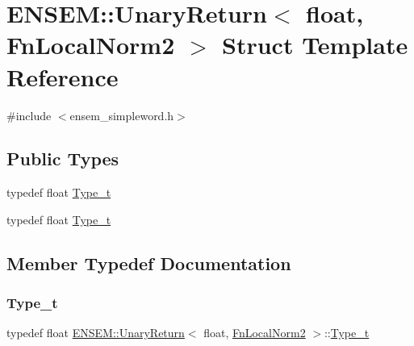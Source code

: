 \hypertarget{structENSEM_1_1UnaryReturn_3_01float_00_01FnLocalNorm2_01_4}{}\section{E\+N\+S\+EM\+:\+:Unary\+Return$<$ float, Fn\+Local\+Norm2 $>$ Struct Template Reference}
\label{structENSEM_1_1UnaryReturn_3_01float_00_01FnLocalNorm2_01_4}


{\ttfamily \#include $<$ensem\+\_\+simpleword.\+h$>$}

\subsection*{Public Types}
\begin{DoxyCompactItemize}
\item 
typedef float \mbox{\hyperlink{structENSEM_1_1UnaryReturn_3_01float_00_01FnLocalNorm2_01_4_ae3f20d3aa61a3012baf0d735dd9441d8}{Type\+\_\+t}}
\item 
typedef float \mbox{\hyperlink{structENSEM_1_1UnaryReturn_3_01float_00_01FnLocalNorm2_01_4_ae3f20d3aa61a3012baf0d735dd9441d8}{Type\+\_\+t}}
\end{DoxyCompactItemize}


\subsection{Member Typedef Documentation}
\mbox{\label{structENSEM_1_1UnaryReturn_3_01float_00_01FnLocalNorm2_01_4_ae3f20d3aa61a3012baf0d735dd9441d8}} 
\subsubsection{\texorpdfstring{Type\_t}{Type\_t}\hspace{0.1cm}{\footnotesize\ttfamily [1/2]}}
{\footnotesize\ttfamily typedef float \mbox{\hyperlink{structENSEM_1_1UnaryReturn}{E\+N\+S\+E\+M\+::\+Unary\+Return}}$<$ float, \mbox{\hyperlink{structENSEM_1_1FnLocalNorm2}{Fn\+Local\+Norm2}} $>$\+::\mbox{\hyperlink{structENSEM_1_1UnaryReturn_3_01float_00_01FnLocalNorm2_01_4_ae3f20d3aa61a3012baf0d735dd9441d8}{Type\+\_\+t}}}

